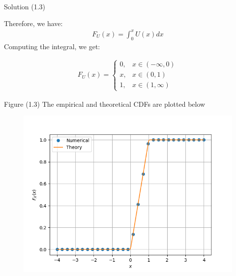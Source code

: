 \documentclass{beamer}
\begin{document}
\begin{frame}{Solution (1.3)}

Therefore, we have:
    \begin{align}
        F_U(x) = \int_0^x U(x) dx
    \end{align}
Computing the integral, we get:

\begin{align}
    F_U(x) = 
    \begin{cases}
        0, & x \in (-\infty,0) \\
        x, & x \in (0,1) \\
        1, & x \in (1, \infty)
    \end{cases}
\end{align}
\end{frame}

\begin{frame}{Figure (1.3)}
    The empirical and theoretical CDFs are plotted below
	\begin{figure}
		\centerline{\includegraphics[width=\textheight]{./figures/CDF_uni.png}}
		\label{fig1}
	\end{figure}	
\end{frame}
\end{document}
